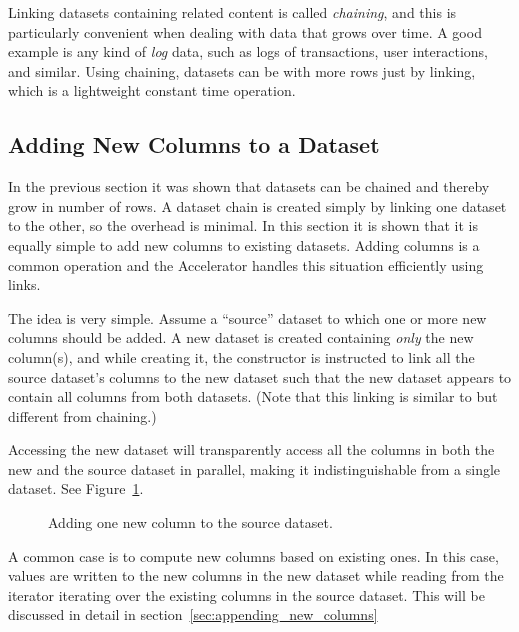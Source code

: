 Linking datasets containing related content is called \emph{chaining},
and this is particularly convenient when dealing with data that grows
over time.  A good example is any kind of \emph{log} data, such as
logs of transactions, user interactions, and similar.  Using chaining,
datasets can be with more rows just by linking, which is a lightweight
constant time operation.



\subsection{Adding New Columns to a Dataset}
In the previous section it was shown that datasets can be chained and
thereby grow in number of rows.  A dataset chain is created simply by
linking one dataset to the other, so the overhead is minimal.  In this
section it is shown that it is equally simple to add new columns to
existing datasets.  Adding columns is a common operation and the
Accelerator handles this situation efficiently using links.

The idea is very simple.  Assume a ``source'' dataset to which one or
more new columns should be added.  A new dataset is created containing
\textsl{only} the new column(s), and while creating it, the
constructor is instructed to link all the source dataset's columns to
the new dataset such that the new dataset appears to contain all
columns from both datasets.  (Note that this linking is similar to but
different from chaining.)

Accessing the new dataset will transparently access all the columns in
both the new and the source dataset in parallel, making it
indistinguishable from a single dataset.  See
Figure~\ref{fig:dep_dataset_append_column}.

\begin{figure}[h!]
  \begin{center}
    
    \caption{Adding one new column to the source dataset.}
    \label{fig:dep_dataset_append_column}
  \end{center}
\end{figure}

A common case is to compute new columns based on existing ones.  In
this case, values are written to the new columns in the new dataset
while reading from the iterator iterating over the existing columns in
the source dataset.  This will be discussed in detail in
section~\ref{sec:appending_new_columns}



